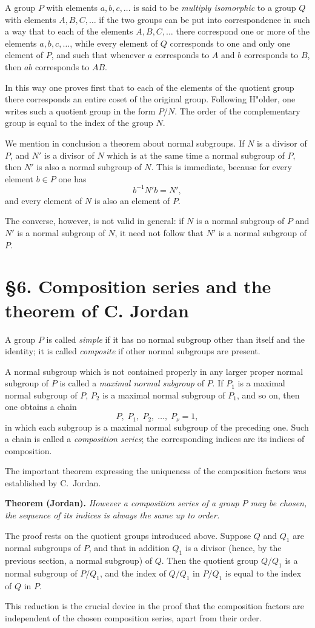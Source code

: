 \documentclass[11pt]{article}
\begin{document}
A group $P$ with elements $a,b,c,\dots$ is said to be \emph{multiply isomorphic} to a group $Q$ with elements $A,B,C,\dots$ if the two groups can be put into correspondence in such a way that to each of the elements $A,B,C,\dots$ there correspond one or more of the elements $a,b,c,\dots$, while every element of $Q$ corresponds to one and only one element of $P$, and such that whenever $a$ corresponds to $A$ and $b$ corresponds to $B$, then $ab$ corresponds to $AB$.

In this way one proves first that to each of the elements of the quotient group there corresponds an entire coset of the original group. Following H"older, one writes such a quotient group in the form $P/N$. The order of the complementary group is equal to the index of the group $N$.

We mention in conclusion a theorem about normal subgroups. If $N$ is a divisor of $P$, and $N'$ is a divisor of $N$ which is at the same time a normal subgroup of $P$, then $N'$ is also a normal subgroup of $N$. This is immediate, because for every element $b\in P$ one has
\[
 b^{-1}N'b = N',
\]
and every element of $N$ is also an element of $P$.

The converse, however, is not valid in general: if $N$ is a normal subgroup of $P$ and $N'$ is a normal subgroup of $N$, it need not follow that $N'$ is a normal subgroup of $P$.

\section*{§6. Composition series and the theorem of C. Jordan}
A group $P$ is called \emph{simple} if it has no normal subgroup other than itself and the identity; it is called \emph{composite} if other normal subgroups are present.

A normal subgroup which is not contained properly in any larger proper normal subgroup of $P$ is called a \emph{maximal normal subgroup} of $P$. If $P_1$ is a maximal normal subgroup of $P$, $P_2$ is a maximal normal subgroup of $P_1$, and so on, then one obtains a chain
\[
 P,\; P_1,\; P_2,\; \dots,\; P_\nu = 1,
\]
in which each subgroup is a maximal normal subgroup of the preceding one. Such a chain is called a \emph{composition series}; the corresponding indices are its indices of composition.

The important theorem expressing the uniqueness of the composition factors was established by C.~Jordan.

\medskip
\noindent\textbf{Theorem (Jordan).} \emph{However a composition series of a group $P$ may be chosen, the sequence of its indices is always the same up to order.}
\medskip

The proof rests on the quotient groups introduced above. Suppose $Q$ and $Q_1$ are normal subgroups of $P$, and that in addition $Q_1$ is a divisor (hence, by the previous section, a normal subgroup) of $Q$. Then the quotient group $Q/Q_1$ is a normal subgroup of $P/Q_1$, and the index of $Q/Q_1$ in $P/Q_1$ is equal to the index of $Q$ in $P$.

This reduction is the crucial device in the proof that the composition factors are independent of the chosen composition series, apart from their order.
\end{document}
